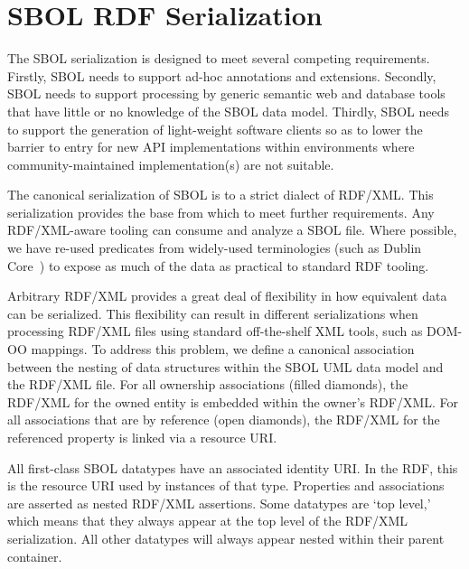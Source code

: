 \section{SBOL RDF Serialization}
\label{sec:serialization}


The SBOL serialization is designed to meet several competing requirements. Firstly, SBOL needs to support ad-hoc annotations and extensions. Secondly, SBOL needs to support processing by generic semantic web and database tools that have little or no knowledge of the SBOL data model. Thirdly, SBOL needs to support the generation of light-weight software clients so as to lower the barrier to entry for new API implementations within environments where community-maintained implementation(s) are not suitable.

The canonical serialization of SBOL is to a strict dialect of RDF/XML. This serialization provides the base from which to meet further requirements. Any RDF/XML-aware tooling can consume and analyze a SBOL file. Where possible, we have re-used predicates from widely-used terminologies (such as Dublin Core~\cite{dcmi2012}) to expose as much of the data as practical to standard RDF tooling.

Arbitrary RDF/XML provides a great deal of flexibility in how equivalent data can be serialized. This flexibility can result in different serializations when processing RDF/XML files using standard off-the-shelf XML tools, such as DOM-OO mappings. To address this problem, we define a canonical association between the nesting of data structures within the SBOL UML data model and the RDF/XML file. For all ownership associations (filled diamonds), the RDF/XML for the owned entity is embedded within the owner's RDF/XML. For all associations that are by reference (open diamonds), the RDF/XML for the referenced property is linked via a resource URI.

All first-class SBOL datatypes have an associated identity URI. In the RDF, this is the resource URI used by instances of that type. Properties and associations are asserted as nested RDF/XML assertions. Some datatypes are `top level,' which means that they always appear at the top level of the RDF/XML serialization. All other datatypes will always appear nested within their parent container.

